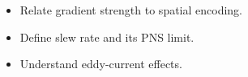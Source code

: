 \begin{objectives}
\begin{itemize}[leftmargin=1.4em,itemsep=2pt]
\item Relate gradient strength to spatial encoding.
\item Define slew rate and its PNS limit.
\item Understand eddy-current effects.
\end{itemize}
\end{objectives}
